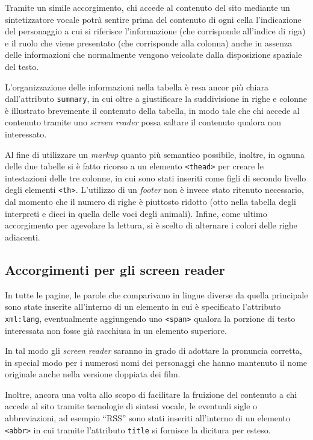 \documentclass[10pt,a4paper,onecolumn]{article}
\newcommand{\inglese}[1]{\foreignlanguage{english}{\itshape{}#1}}
\begin{document}
Tramite un simile accorgimento, chi accede al contenuto del sito mediante un sintetizzatore vocale potrà sentire prima del contenuto di ogni cella l'indicazione del personaggio a cui si riferisce l'informazione (che corrisponde all'indice di riga) e il ruolo che viene presentato (che corrisponde alla colonna) anche in assenza delle informazioni che normalmente vengono veicolate dalla disposizione spaziale del testo.

L'organizzazione delle informazioni nella tabella è resa ancor più chiara dall'attributo \texttt{summary}, in cui oltre a giustificare la suddivisione in righe e colonne è illustrato brevemente il contenuto della tabella, in modo tale che chi accede al contenuto tramite uno \inglese{screen reader} possa saltare il contenuto qualora non interessato.

Al fine di utilizzare un \inglese{markup} quanto più semantico possibile, inoltre, in ognuna delle due tabelle si è fatto ricorso a un elemento \texttt{<thead>} per creare le intestazioni delle tre colonne, in cui sono stati inseriti come figli di secondo livello degli elementi \texttt{<th>}. L'utilizzo di un \inglese{footer} non è invece stato ritenuto necessario, dal momento che il numero di righe è piuttosto ridotto (otto nella tabella degli interpreti e dieci in quella delle voci degli animali). Infine, come ultimo accorgimento per agevolare la lettura, si è scelto di alternare i colori delle righe adiacenti.

\subsection{Accorgimenti per gli screen reader}
In tutte le pagine, le parole che comparivano in lingue diverse da quella principale sono state inserite all'interno di un elemento in cui è specificato l'attributo \texttt{xml:lang}, eventualmente aggiungendo uno \texttt{<span>} qualora la porzione di testo interessata non fosse già racchiusa in un elemento superiore.

In tal modo gli \inglese{screen reader} saranno in grado di adottare la pronuncia corretta, in special modo per i numerosi nomi dei personaggi che hanno mantenuto il nome originale anche nella versione doppiata dei film.

Inoltre, ancora una volta allo scopo di facilitare la fruizione del contenuto a chi accede al sito tramite tecnologie di sintesi vocale, le eventuali sigle o abbreviazioni, ad esempio ``RSS'' sono stati inseriti all'interno di un elemento \texttt{<abbr>} in cui tramite l'attributo \texttt{title} si fornisce la dicitura per esteso.
\end{document}
